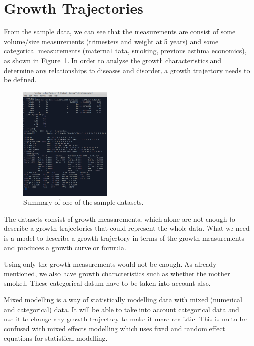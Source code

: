 \documentclass[bsc]{abdnthesis}
\begin{document}
\section{Growth Trajectories} %
\label{sec:growth_trajectories}
From the sample data, we can see that the measurements are consist of some volume/size measurements (trimesters and weight at 5 years) and some categorical measurements (maternal data, smoking, previous asthma economics), as shown in Figure~\ref{sample_data}. In order to analyse the growth characteristics and determine any relationships to diseases and disorder, a growth trajectory needs to be defined. 

\begin{figure}[h]
  \centering
    \includegraphics[width=0.4\textwidth]{sample_data}
  \caption{Summary of one of the sample datasets.}
  \label{sample_data}
\end{figure}

The datasets consist of growth measurements, which alone are not enough to describe a growth trajectories that could represent the whole data. What we need is a model to describe a growth trajectory in terms of the growth measurements and produces a growth curve or formula.

Using only the growth measurements would not be enough. As already mentioned, we also have growth characteristics such as whether the mother smoked. These categorical datum have to be taken into account also. 

Mixed modelling is a way of statistically modelling data with mixed (numerical and categorical) data. It will be able to take into account categorical data and use it to change any growth trajectory to make it more realistic. This is no to be confused with mixed effects modelling which uses fixed and random effect equations for statistical modelling. 
\end{document}
